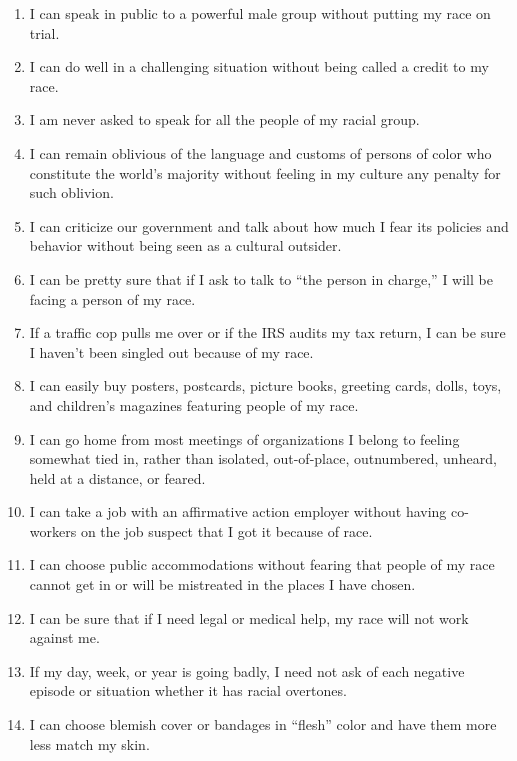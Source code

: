 \documentclass{article}
\begin{document}
\begin{enumerate}
	\item I can speak in public to a powerful male group without putting my
		race on trial.

	\item I can do well in a challenging situation without being called a
		credit to my race.

	\item I am never asked to speak for all the people of my racial group.

	\item I can remain oblivious of the language and customs of persons of
		color who constitute the world's majority without feeling in my culture
		any penalty for such oblivion.

	\item I can criticize our government and talk about how much I fear its
		policies and behavior without being seen as a cultural outsider.

	\item I can be pretty sure that if I ask to talk to ``the person in
		charge,'' I will be facing a person of my race.

	\item If a traffic cop pulls me over or if the IRS audits my tax return, I
		can be sure I haven't been singled out because of my race.

	\item I can easily buy posters, postcards, picture books, greeting cards,
		dolls, toys, and children's magazines featuring people of my race.

	\item I can go home from most meetings of organizations I belong to feeling
		somewhat tied in, rather than isolated, out-of-place, outnumbered,
		unheard, held at a distance, or feared.

	\item I can take a job with an affirmative action employer without having
		co-workers on the job suspect that I got it because of race.

	\item I can choose public accommodations without fearing that people of my
		race cannot get in or will be mistreated in the places I have chosen.

	\item I can be sure that if I need legal or medical help, my race will not
		work against me.

	\item If my day, week, or year is going badly, I need not ask of each
		negative episode or situation whether it has racial overtones.

	\item I can choose blemish cover or bandages in ``flesh'' color and have
		them more less match my skin.
\end{enumerate}
\end{document}
